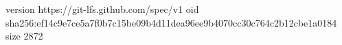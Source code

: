 version https://git-lfs.github.com/spec/v1
oid sha256:ef14c9e7ce5a7f0b7c15be09b4d11dea96ee9b4070cc30c764c2b12cbe1a0184
size 2872
